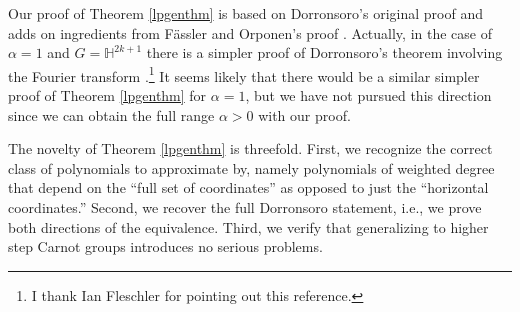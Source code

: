 \documentclass[11pt,reqno]{amsart}
\newcommand{\1}{\mathbf 1}
\begin{document}
Our proof of Theorem \ref{lpgenthm} is based on Dorronsoro's original proof \cite{dorronsoro1985characterization} and adds on ingredients from F\"assler and Orponen's proof \cite{fassler2020dorronsoro}. Actually, in the case of $\alpha=1$ and $G=\mathbb{H}^{2k+1}$ there is a simpler proof of Dorronsoro's theorem involving the Fourier transform \cite[Subsection 7.3]{azzam2016bi}.\footnote{I thank Ian Fleschler for pointing out this reference.} It seems likely that there would be a similar simpler proof of Theorem \ref{lpgenthm} for $\alpha=1$, but we have not pursued this direction since we can obtain the full range $\alpha>0$ with our proof.

The novelty of Theorem \ref{lpgenthm} is threefold. First, we recognize the correct class of polynomials to approximate by, namely polynomials of weighted degree that depend on the ``full set of coordinates'' as opposed to just the ``horizontal coordinates.'' Second, we recover the full Dorronsoro statement, i.e., we prove both directions of the equivalence. Third, we verify that generalizing to higher step Carnot groups introduces no serious problems.
\end{document}
